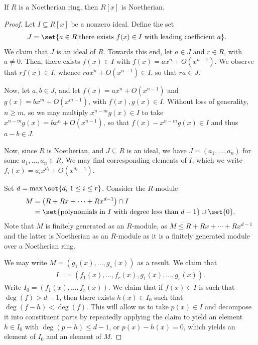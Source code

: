 \documentclass[10pt]{mypackage}
\begin{document}
\begin{theorem}
  If $R$ is a Noetherian ring, then $R[x]$ is Noetherian.
\end{theorem}
\begin{proof}
  Let $I\subseteq R[x]$ be a nonzero ideal. Define the set
  \begin{align*}
    J &= \set{a\in R | \text{there exists }f(x)\in I\text{ with leading coefficient }a}.
  \end{align*}
  We claim that $J$ is an ideal of $R$. Towards this end, let $a\in J$ and $r\in R$, with $a\neq 0$. Then, there exists $f(x)\in I$ with $f(x) = ax^{n} + O\left( x^{n-1} \right)$. We observe that $r f(x)\in I$, whence $ra x^{n} + O\left( x^{n-1} \right)\in I$, so that $ra\in J$.%

  Now, let $a,b\in J$, and let $f(x) = ax^{n} + O\left( x^{n-1} \right)$ and $g(x) = bx^{m} + O\left( x^{m-1} \right)$, with $f(x),g(x)\in I$. Without loss of generality, $n\geq m$, so we may multiply $x^{n-m}g(x)\in I$ to take $x^{n-m}g(x) = bx^{n} + O\left( x^{n-1} \right)$, so that $f(x) - x^{n-m}g(x)\in I$ and thus $a-b\in J$.%

  Now, since $R$ is Noetherian, and $J\subseteq R$ is an ideal, we have $J = \left( a_1,\dots,a_n \right)$ for some $a_1,\dots,a_n\in R$. We may find corresponding elements of $I$, which we write $f_i(x) = a_i x^{d_i} + O\left( x^{d_i-1} \right)$. 

  Set $d = \max\set{d_i | 1\leq i \leq r}$. Consider the $R$-module
  \begin{align*}
    M &= \left( R + Rx + \cdots + Rx^{d-1} \right)\cap I\\
      &= \set{\text{polynomials in }I\text{ with degree less than }d-1}\cup \set{0}.
  \end{align*}
  Note that $M$ is finitely generated as an $R$-module, as $M\leq R + Rx + \cdots + Rx^{d-1}$ and the latter is Noetherian as an $R$-module as it is a finitely generated module over a Noetherian ring.%

  We may write $M = \left( g_1(x) ,\dots, g_s(x) \right)$ as a result. We claim that
  \begin{align*}
    I &= \left( f_1(x),\dots,f_r(x),g_1(x),\dots,g_s(x) \right).
  \end{align*}
  Write $I_0 = \left( f_1(x),\dots,f_r(x) \right)$. We claim that if $f(x)\in I$ is such that $\deg(f) > d-1$, then there exists $h(x)\in I_0$ such that $\deg\left( f-h \right) < \deg\left( f \right)$. This will allow us to take $p(x)\in I$ and decompose it into constituent parts by repeatedly applying the claim to yield an element $h\in I_0$ with $\deg\left( p-h \right)\leq d-1$, or $p(x) - h(x) = 0$, which yields an element of $I_0$ and an element of $M$.%


\end{proof}
\end{document}
